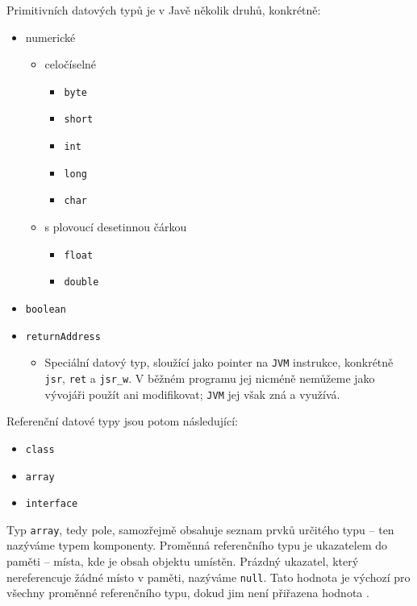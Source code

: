 Primitivních datových typů je v Javě několik druhů, konkrétně:

\begin{itemize}
	\item numerické
	\begin{itemize}
		\item celočíselné
			\begin{itemize}
				\item \texttt{byte}
				\item \texttt{short}
				\item \texttt{int}
				\item \texttt{long}
				\item \texttt{char}
			\end{itemize}
		\item s plovoucí desetinnou čárkou
			\begin{itemize}
				\item \texttt{float}
				\item \texttt{double}
			\end{itemize}
		\end{itemize}
	\item \texttt{boolean}
	\item \texttt{returnAddress}
		\begin{itemize}
			\item Speciální datový typ, sloužící jako pointer na \texttt{JVM} instrukce, konkrétně \texttt{jsr}, \texttt{ret} a \texttt{jsr\_w}. V běžném programu jej nicméně nemůžeme jako vývojáři použít ani modifikovat; \texttt{JVM} jej však zná a využívá.
		\end{itemize}
\end{itemize}

Referenční datové typy jsou potom následující:
\label{ref-types}
\begin{itemize}
	\item \texttt{class}
	\item \texttt{array}
	\item \texttt{interface}
\end{itemize}

Typ \texttt{array}, tedy pole, samozřejmě obsahuje seznam prvků určitého typu -- ten nazýváme typem komponenty. Proměnná referenčního typu je ukazatelem do paměti -- místa, kde je obsah objektu umístěn. Prázdný ukazatel, který nereferencuje žádné místo v paměti, nazýváme \texttt{null}. Tato hodnota je výchozí pro všechny proměnné referenčního typu, dokud jim není přiřazena hodnota \cite{jvms}. 

